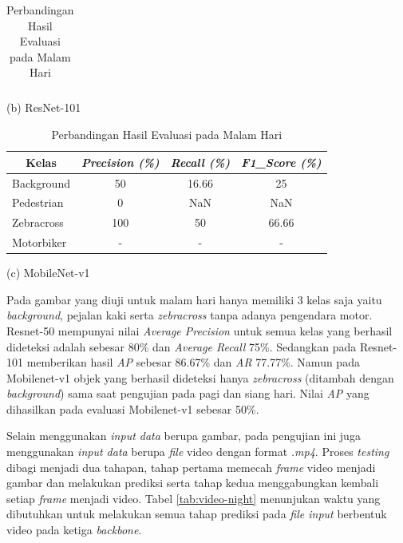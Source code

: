 \begin{table}[!h]
\begin{minipage}[b]{\textwidth}
\begin{tabular}{|l|c|c|c|}
		\end{tabular}
		\caption*{(b) ResNet-101}
	\end{minipage}
	\vfill
	\begin{minipage}[b]{\textwidth}
		\centering
		\begin{tabular}{|l|c|c|c|}
			\hline
			\multicolumn{1}{|c|}{\textbf{Kelas}} & \textit{\textbf{Precision (\%)}} & \textit{\textbf{Recall (\%)}} & \textit{\textbf{F1\_Score (\%)}} \\ \hline
			Background                           & 50                               & 16.66                         & 25                               \\ \hline
			Pedestrian                           & 0                                & NaN                           & NaN                              \\ \hline
			Zebracross                           & 100                              & 50                            & 66.66                            \\ \hline
			Motorbiker                           & -                                & -                             & -                                \\ \hline
		\end{tabular}
		\caption*{(c) MobileNet-v1}
	\end{minipage}
	\caption{{Perbandingan Hasil Evaluasi pada Malam Hari}}
	\label{tab:evaluate-night}
\end{table}

Pada gambar yang diuji untuk malam hari hanya memiliki 3 kelas saja yaitu \textit{background}, pejalan kaki serta \textit{zebracross} tanpa adanya pengendara motor. Resnet-50 mempunyai nilai \textit{Average Precision} untuk semua kelas yang berhasil dideteksi adalah sebesar 80\% dan \textit{Average Recall} 75\%. Sedangkan pada Resnet-101 memberikan hasil \textit{AP} sebesar 86.67\% dan \textit{AR} 77.77\%. Namun pada Mobilenet-v1 objek yang berhasil dideteksi hanya \textit{zebracross} (ditambah dengan \textit{background}) sama saat pengujian pada pagi dan siang hari. Nilai \textit{AP} yang dihasilkan pada evaluasi Mobilenet-v1 sebesar 50\%.

Selain menggunakan \textit{input data} berupa gambar, pada pengujian ini juga menggunakan \textit{input data} berupa \textit{file} video dengan format \textit{.mp4}. Proses \textit{testing} dibagi menjadi dua tahapan, tahap pertama memecah \textit{frame} video menjadi gambar dan melakukan prediksi serta tahap kedua menggabungkan kembali setiap \textit{frame} menjadi video. Tabel \ref{tab:video-night} menunjukan waktu yang dibutuhkan untuk melakukan semua tahap prediksi pada \textit{file input} berbentuk video pada ketiga \textit{backbone}.

